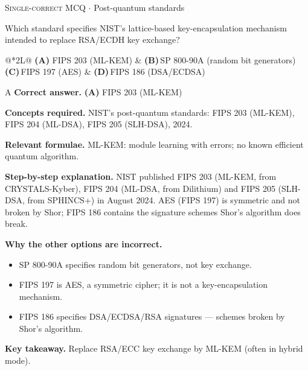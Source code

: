 \documentclass[11pt,a4paper]{article}
\newcommand{\optlabel}[1]{\textbf{(#1)}}
\newcommand{\correctlabel}[1]{\textcolor{okgreen}{\textbf{(#1)}\,\ding{51}}}
\newenvironment{qitem}[1]{\begin{list}{}{\setlength{\leftmargin}{3.3em}\setlength{\labelwidth}{3.1em}%
  \setlength{\labelsep}{0.2em}\setlength{\topsep}{3pt}\setlength{\parsep}{3pt}}\item[\textbf{Q.#1}\hfill]}{\end{list}}
\newcommand{\qsep}{\par\vspace{2pt}{\color{black!15}\hrule}\vspace{4pt}}
\newcommand{\qmeta}[2]{{\footnotesize\color{black!60}\textsc{#1} \;$\cdot$\; #2}\par}
\begin{document}
\begin{qitem}{73}
\qmeta{Single-correct MCQ}{Post-quantum standards}
Which standard specifies NIST's lattice-based key-encapsulation mechanism intended to replace RSA/ECDH key exchange?
\par\smallskip\noindent\begin{tabularx}{\linewidth}{@{}*{2}{L}@{}}
\correctlabel{A}\,FIPS 203 (ML-KEM) & \optlabel{B}\,SP 800-90A (random bit generators) \\[3pt]
\optlabel{C}\,FIPS 197 (AES) & \optlabel{D}\,FIPS 186 (DSA/ECDSA)
\end{tabularx}
\end{qitem}
\begin{solbox}{A}
\textbf{\color{brand}Correct answer.} \textcolor{okgreen}{\textbf{(A)}} FIPS 203 (ML-KEM)

\textbf{\color{brand}Concepts required.} NIST's post-quantum standards: FIPS 203 (ML-KEM), FIPS 204 (ML-DSA), FIPS 205 (SLH-DSA), 2024.

\textbf{\color{brand}Relevant formulae.} ML-KEM: module learning with errors; no known efficient quantum algorithm.

\textbf{\color{brand}Step-by-step explanation.} NIST published FIPS 203 (ML-KEM, from CRYSTALS-Kyber), FIPS 204 (ML-DSA, from Dilithium) and FIPS 205 (SLH-DSA, from SPHINCS+) in August 2024. AES (FIPS 197) is
symmetric and not broken by Shor; FIPS 186 contains the signature schemes Shor's algorithm does break.

\textbf{\color{brand}Why the other options are incorrect.}
\begin{itemize}[leftmargin=2.4em, itemsep=1pt, topsep=2pt]
\item[\textbf{(B)}] SP 800-90A specifies random bit generators, not key exchange.
\item[\textbf{(C)}] FIPS 197 is AES, a symmetric cipher; it is not a key-encapsulation mechanism.
\item[\textbf{(D)}] FIPS 186 specifies DSA/ECDSA/RSA signatures --- schemes broken by Shor's algorithm.
\end{itemize}
\textbf{\color{brand}Key takeaway.} Replace RSA/ECC key exchange by ML-KEM (often in hybrid mode).
\end{solbox}
\qsep
\end{document}
